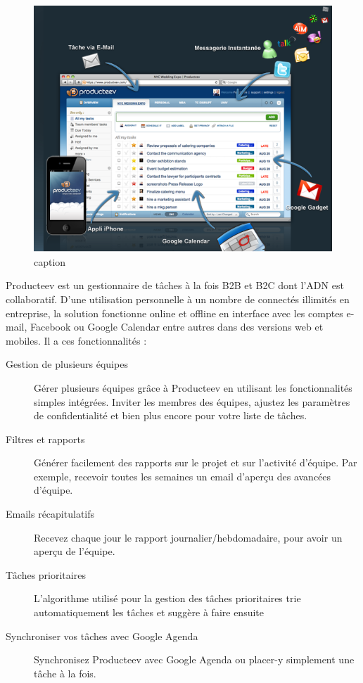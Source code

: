 \begin{figure}[htbp]
	\centering
		\includegraphics[width=6in]{Image/Producteev.png}
	\caption{caption}
	\label{fig:Image_Producteev}
\end{figure}

Producteev est un gestionnaire de tâches à la fois B2B et B2C dont l’ADN est collaboratif. D’une utilisation personnelle à un nombre de connectés illimités en entreprise, la solution fonctionne online et offline en interface avec les comptes e-mail, Facebook ou Google Calendar entre autres dans des versions web et mobiles. Il a ces fonctionnalités :
\begin{description}
	\item[Gestion de plusieurs équipes] Gérer plusieurs équipes grâce à Producteev en utilisant les fonctionnalités simples intégrées. Inviter les membres des équipes, ajustez les paramètres de confidentialité et bien plus encore pour votre liste de tâches.
	\item[Filtres et rapports] Générer facilement des rapports sur le projet et sur l'activité d'équipe. Par exemple, recevoir toutes les semaines un email d'aperçu des avancées d'équipe.
	\item[Emails récapitulatifs] Recevez chaque jour le rapport journalier/hebdomadaire, pour avoir un aperçu de l'équipe.
	\item[Tâches prioritaires]  L'algorithme utilisé pour la gestion des tâches prioritaires trie automatiquement les tâches et  suggère à faire ensuite
	\item[Synchroniser vos tâches avec Google Agenda] Synchronisez Producteev avec Google Agenda ou placer-y simplement une tâche à la fois. 
\end{description}

